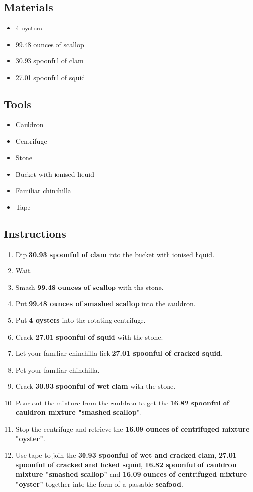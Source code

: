 \documentclass{article}
\begin{document}
\subsection{Materials}\begin{itemize}
\item 
4 oysters
\item 
99.48 ounces of scallop
\item 
30.93 spoonful of clam
\item 
27.01 spoonful of squid
\end{itemize}
\subsection{Tools}\begin{itemize}
\item 
Cauldron
\item 
Centrifuge
\item 
Stone
\item 
Bucket with ionised liquid
\item 
Familiar chinchilla
\item 
Tape
\end{itemize}
\subsection{Instructions}\begin{enumerate}
\item 
Dip \textbf{30.93 spoonful of clam} into the bucket with ionised liquid.
\item 
Wait.
\item 
Smash \textbf{99.48 ounces of scallop} with the stone.
\item 
Put \textbf{99.48 ounces of smashed scallop} into the cauldron.
\item 
Put \textbf{4 oysters} into the rotating centrifuge.
\item 
Crack \textbf{27.01 spoonful of squid} with the stone.
\item 
Let your familiar chinchilla lick \textbf{27.01 spoonful of cracked squid}.
\item 
Pet your familiar chinchilla.
\item 
Crack \textbf{30.93 spoonful of wet clam} with the stone.
\item 
Pour out the mixture from the cauldron to get the \textbf{16.82 spoonful of cauldron mixture "smashed scallop"}.
\item 
Stop the centrifuge and retrieve the \textbf{16.09 ounces of centrifuged mixture "oyster"}.
\item 
Use tape to join the \textbf{30.93 spoonful of wet and cracked clam}, \textbf{27.01 spoonful of cracked and licked squid}, \textbf{16.82 spoonful of cauldron mixture "smashed scallop"} and \textbf{16.09 ounces of centrifuged mixture "oyster"} together into the form of a passable \textbf{seafood}.
\end{enumerate}
\newpage
\end{document}
